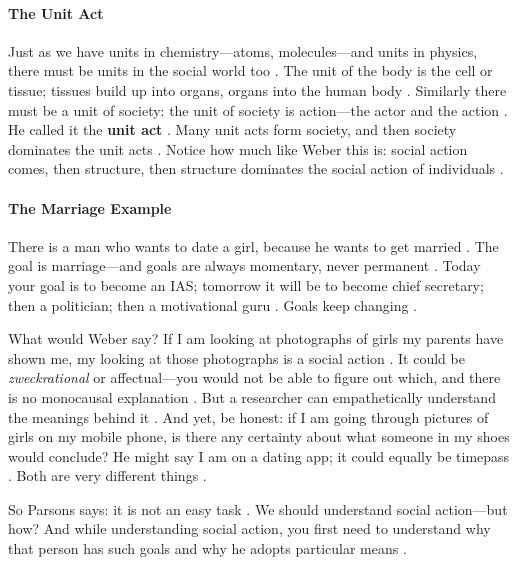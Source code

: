 \paragraph{The Unit Act}
\begin{KeyConcept}
Just as we have units in chemistry---atoms, molecules---and units in physics, there must be units in the social world too .
The unit of the body is the cell or tissue; tissues build up into organs, organs into the human body . Similarly there must be a unit of society: the unit of society is action---the actor and the action .
He called it the \textbf{unit act} . Many unit acts form society, and then society dominates the unit acts .
Notice how much like Weber this is: social action comes, then structure, then structure dominates the social action of individuals .
\end{KeyConcept}

\paragraph{The Marriage Example}
There is a man who wants to date a girl, because he wants to get married . The goal is marriage---and goals are always momentary, never permanent . Today your goal is to become an IAS; tomorrow it will be to become chief secretary; then a politician; then a motivational guru . Goals keep changing .

What would Weber say? If I am looking at photographs of girls my parents have shown me, my looking at those photographs is a social action . It could be \textit{zweckrational} or affectual---you would not be able to figure out which, and there is no monocausal explanation . But a researcher can empathetically understand the meanings behind it .
And yet, be honest: if I am going through pictures of girls on my mobile phone, is there any certainty about what someone in my shoes would conclude? He might say I am on a dating app; it could equally be timepass . Both are very different things .

So Parsons says: it is not an easy task . We should understand social action---but how? And while understanding social action, you first need to understand why that person has such goals and why he adopts particular means .

